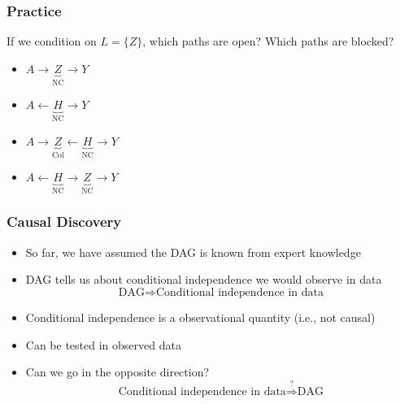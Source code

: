 \documentclass{beamer}
\begin{document}
\begin{frame}
\frametitle{Practice}

  \begin{figure}[t]
\end{figure}

If we condition on $L = \{Z\}$, which paths are open? Which paths are blocked?
\begin{itemize}
\item $A \rightarrow \underbrace{\boxed{Z}}_{\text{NC}} \rightarrow Y$ \hfill {}
\item $A \leftarrow \underbrace{H}_{\text{NC}} \rightarrow Y$ \hfill {}
\item $A \rightarrow \underbrace{\boxed{Z}}_{\text{Col}}  \leftarrow \underbrace{H}_{\text{NC}} \rightarrow Y$ \hfill {}
\item $A \leftarrow \underbrace{H}_{\text{NC}}  \rightarrow \underbrace{\boxed{Z}}_{\text{NC}} \rightarrow Y$ \hfill {}
\end{itemize}

\end{frame}


\begin{frame}
\frametitle{Causal Discovery}

\begin{itemize}
    \item So far, we have assumed the DAG is known from expert knowledge
    \item DAG tells us about conditional independence we would observe in data
    \[ \text{DAG} \Rightarrow \text{Conditional independence in data} \]
    \pause
    \item Conditional independence is a observational quantity (i.e., not causal)
    \item Can be tested in observed data
    \item Can we go in the opposite direction?
    \[ \text{Conditional independence in data} \stackrel{?}{\Rightarrow} \text{DAG} \]
\end{itemize}

\end{frame}
\end{document}
